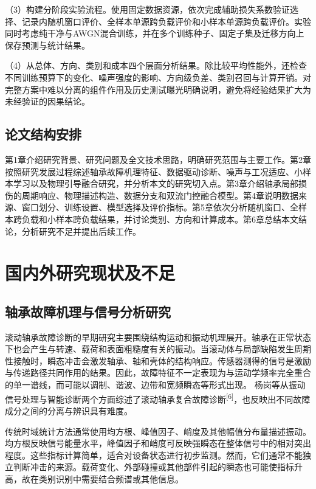 \documentclass[UTF8,12pt,openany,twoside]{ctexbook}
\numberwithin{equation}{chapter}
\begin{document}
（3）构建分阶段实验流程。使用固定数据资源，依次完成辅助损失系数验证选择、记录内随机窗口评价、全样本单源跨负载评价和小样本单源跨负载评价。实验同时考虑纯干净与AWGN混合训练，并在多个训练种子、固定子集及迁移方向上保存预测与统计结果。

（4）从总体、方向、类别和成本四个层面分析结果。除比较平均性能外，还检查不同训练预算下的变化、噪声强度的影响、方向级负差、类别召回与计算开销。对完整方案中难以分离的组件作用及历史测试曝光明确说明，避免将经验结果扩大为未经验证的因果结论。

\section{论文结构安排}\label{ux8bbaux6587ux7ed3ux6784ux5b89ux6392}

第1章介绍研究背景、研究问题及全文技术思路，明确研究范围与主要工作。第2章按照研究发展过程综述轴承故障机理特征、数据驱动诊断、噪声与工况适应、小样本学习以及物理引导融合研究，并分析本文的研究切入点。第3章介绍轴承局部损伤的周期响应、物理描述构造、数据分支和双流门控融合模型。第4章说明数据来源、窗口划分、训练设置、模型选择及评价指标。第5章依次分析随机窗口、全样本跨负载和小样本跨负载结果，并讨论类别、方向和计算成本。第6章总结本文结论，分析研究不足并提出后续工作。

\chapter{国内外研究现状及不足}\label{ux7b2c2ux7ae0-ux56fdux5185ux5916ux7814ux7a76ux73b0ux72b6ux53caux4e0dux8db3}

\section{轴承故障机理与信号分析研究}\label{ux8f74ux627fux6545ux969cux673aux7406ux4e0eux4fe1ux53f7ux5206ux6790ux7814ux7a76}

滚动轴承故障诊断的早期研究主要围绕结构运动和振动机理展开。轴承在正常状态下也会产生与转速、载荷和表面粗糙度有关的振动。当滚动体与局部缺陷发生周期性接触时，瞬态冲击会激发轴承、轴和壳体的结构响应。传感器测得的信号是激励与传递路径共同作用的结果。因此，故障特征不一定表现为与运动学频率完全重合的单一谱线，而可能以调制、谐波、边带和宽频瞬态等形式出现。 杨岗等从振动信号处理与智能诊断两个方面综述了滚动轴承复合故障诊断\textsuperscript{[6]}，也反映出不同故障成分之间的分离与辨识具有难度。

传统时域统计方法通常使用均方根、峰值因子、峭度及其他幅值分布量描述振动。均方根反映信号能量水平，峰值因子和峭度可反映强瞬态在整体信号中的相对突出程度。这些指标计算简单，适合对设备状态进行初步监测。然而，它们通常不能独立判断冲击的来源。载荷变化、外部碰撞或其他部件引起的瞬态也可能使指标升高，故在类别识别中需要结合频谱或其他信息。
\end{document}

